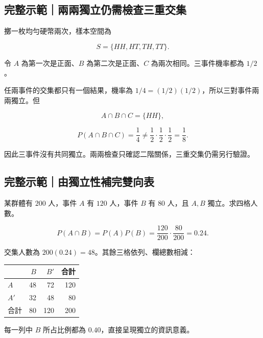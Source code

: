 \documentclass[11pt,a4paper]{article}
\newcounter{none}
\begin{document}
\begin{HandoutWorkedExample}

\subsection{完整示範｜兩兩獨立仍需檢查三重交集}\label{ux5b8cux6574ux793aux7bc4ux5169ux5169ux7368ux7acbux4ecdux9700ux6aa2ux67e5ux4e09ux91cdux4ea4ux96c6}

擲一枚均勻硬幣兩次，樣本空間為

\[
S=\{HH,HT,TH,TT\}.
\]

令 \(A\) 為第一次是正面、\(B\) 為第二次是正面、\(C\) 為兩次相同。三事件機率都為 \(1/2\)。

任兩事件的交集都只有一個結果，機率為 \(1/4=(1/2)(1/2)\)，所以三對事件兩兩獨立。但

\[
A\cap B\cap C=\{HH\},
\]

\[
P(A\cap B\cap C)=\frac14
\ne
\frac12\cdot\frac12\cdot\frac12=\frac18.
\]

因此三事件沒有共同獨立。兩兩檢查只確認二階關係，三重交集仍需另行驗證。

\end{HandoutWorkedExample}

\begin{HandoutWorkedExample}

\subsection{完整示範｜由獨立性補完雙向表}\label{ux5b8cux6574ux793aux7bc4ux7531ux7368ux7acbux6027ux88dcux5b8cux96d9ux5411ux8868}

某群體有 \(200\) 人，事件 \(A\) 有 \(120\) 人，事件 \(B\) 有 \(80\) 人，且 \(A,B\) 獨立。求四格人數。

\[
P(A\cap B)=P(A)P(B)
=\frac{120}{200}\cdot\frac{80}{200}
=0.24.
\]

交集人數為 \(200(0.24)=48\)。其餘三格依列、欄總數相減：

{\def\LTcaptype{none} %
\begin{longtable}[]{@{}lrrr@{}}
\toprule\noalign{}
& \(B\) & \(B'\) & 合計 \\
\midrule\noalign{}
\endhead
\bottomrule\noalign{}
\endlastfoot
\(A\) & 48 & 72 & 120 \\
\(A'\) & 32 & 48 & 80 \\
合計 & 80 & 120 & 200 \\
\end{longtable}
}

每一列中 \(B\) 所占比例都為 \(0.40\)，直接呈現獨立的資訊意義。

\end{HandoutWorkedExample}
\end{document}
